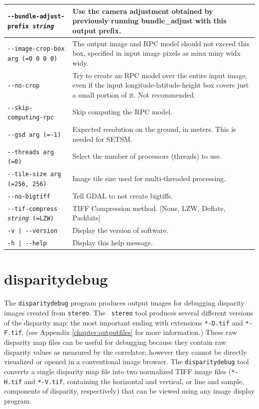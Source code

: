\begin{longtable}{|l|p{7.0cm}|}
\texttt{-\/-bundle-adjust-prefix \textit{string}} & Use the camera
adjustment obtained by previously running bundle\_adjust with this
output prefix. \\ \hline
\texttt{-\/-image-crop-box arg (=0 0 0 0)} & The output image and RPC model should not exceed this box, specified in input image pixels as minx miny widx widy.\\ \hline
\texttt{-\/-no-crop} & Try to create an RPC model over the entire input image, even if the input longitude-latitude-height box covers just a small portion of it. Not recommended.\\ \hline
\texttt{-\/-skip-computing-rpc} & Skip computing the RPC model.\\ \hline
\texttt{-\/-gsd arg (=-1)} & Expected resolution on the ground, in meters. This is needed for SETSM.\\ \hline
\texttt{-\/-threads arg (=0)} & Select the number of processors (threads) to use.\\ \hline
\texttt{-\/-tile-size arg (=256, 256)} & Image tile size used for multi-threaded processing.\\ \hline
\texttt{-\/-no-bigtiff} & Tell GDAL to not create bigtiffs.\\ \hline
\texttt{-\/-tif-compress \textit{string} (=LZW)} & TIFF Compression method. [None, LZW, Deflate, Packbits]\\ \hline
\texttt{-v | -\/-version } & Display the version of software.\\ \hline
\texttt{-h | -\/-help } & Display this help message.\\ \hline
\end{longtable}


\clearpage

\section{disparitydebug}
\label{disparitydebug}

The \texttt{disparitydebug} program produces output images for
debugging disparity images created from \verb#stereo#. The {\tt
stereo} tool produces several different versions of the disparity
map; the most important ending with extensions \verb#*-D.tif# and
\verb#*-F.tif#. (see Appendix \ref{chapter:outputfiles} for more
information.)  These raw disparity map files can be useful for
debugging because they contain raw disparity values as measured by
the correlator; however they cannot be directly visualized or opened
in a conventional image browser.  The \verb#disparitydebug# tool
converts a single disparity map file into two normalized TIFF image
files (\verb#*-H.tif# and \verb#*-V.tif#, containing the horizontal
and vertical, or line and sample, components of disparity, respectively)
that can be viewed using any image display program.

